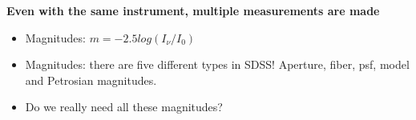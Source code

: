 \documentclass[letterpaper,landscape]{slides}
\begin{document}







\begin{slide}
	\begin{center}
		\bfseries
		{\large {\color{red} Even with the same instrument, multiple measurements are made}}
	\end{center}
	\vskip 0.6in
	
	\begin{itemize}
		\item {\color{blue} Magnitudes:} $m=-2.5 log(I_\nu / I_0)$ 
		\item {\color{blue} Magnitudes:} there are five different types in SDSS! Aperture,
		fiber, psf, model and Petrosian magnitudes.   
		\item {\color{red} Do we really need all these magnitudes?} 
	\end{itemize}
	
\end{slide}



\end{document}
